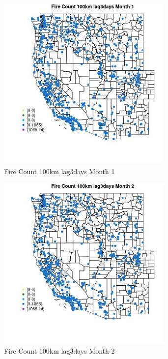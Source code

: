 \begin{figure} 
\centering  
\includegraphics[width=0.77\textwidth]{Code_Outputs/Report_ML_input_PM25_Step4_part_f_de_duplicated_aves_prioritize_24hr_obswNAs_MapObsMo1Fire_Count_100km_lag3days.jpg} 
\caption{\label{fig:Report_ML_input_PM25_Step4_part_f_de_duplicated_aves_prioritize_24hr_obswNAsMapObsMo1Fire_Count_100km_lag3days}Fire Count 100km lag3days Month 1} 
\end{figure} 
 

\begin{figure} 
\centering  
\includegraphics[width=0.77\textwidth]{Code_Outputs/Report_ML_input_PM25_Step4_part_f_de_duplicated_aves_prioritize_24hr_obswNAs_MapObsMo2Fire_Count_100km_lag3days.jpg} 
\caption{\label{fig:Report_ML_input_PM25_Step4_part_f_de_duplicated_aves_prioritize_24hr_obswNAsMapObsMo2Fire_Count_100km_lag3days}Fire Count 100km lag3days Month 2} 
\end{figure} 
 

